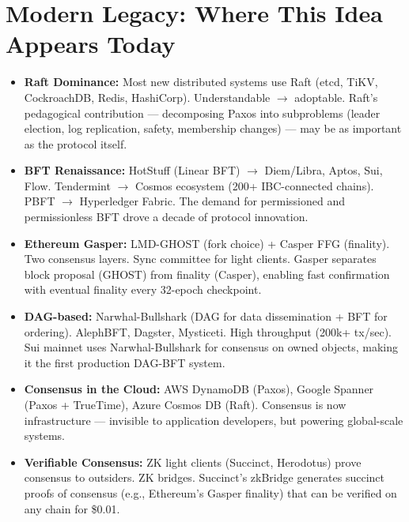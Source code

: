 \section{Modern Legacy: Where This Idea Appears Today}
\label{sec:consensus:legacy}

\begin{itemize}
\item \textbf{Raft Dominance:} Most new distributed systems use Raft (etcd, TiKV, CockroachDB, Redis, HashiCorp). Understandable $\to$ adoptable. Raft's pedagogical contribution — decomposing Paxos into subproblems (leader election, log replication, safety, membership changes) — may be as important as the protocol itself.

\item \textbf{BFT Renaissance:} HotStuff (Linear BFT) $\to$ Diem/Libra, Aptos, Sui, Flow. Tendermint $\to$ Cosmos ecosystem (200+ IBC-connected chains). PBFT $\to$ Hyperledger Fabric. The demand for permissioned and permissionless BFT drove a decade of protocol innovation.

\item \textbf{Ethereum Gasper:} LMD-GHOST (fork choice) + Casper FFG (finality). Two consensus layers. Sync committee for light clients. Gasper separates block proposal (GHOST) from finality (Casper), enabling fast confirmation with eventual finality every 32-epoch checkpoint.

\item \textbf{DAG-based:} Narwhal-Bullshark (DAG for data dissemination + BFT for ordering). AlephBFT, Dagster, Mysticeti. High throughput (200k+ tx/sec). Sui mainnet uses Narwhal-Bullshark for consensus on owned objects, making it the first production DAG-BFT system.

\item \textbf{Consensus in the Cloud:} AWS DynamoDB (Paxos), Google Spanner (Paxos + TrueTime), Azure Cosmos DB (Raft). Consensus is now infrastructure — invisible to application developers, but powering global-scale systems.

\item \textbf{Verifiable Consensus:} ZK light clients (Succinct, Herodotus) prove consensus to outsiders. ZK bridges. Succinct's zkBridge generates succinct proofs of consensus (e.g., Ethereum's Gasper finality) that can be verified on any chain for \$0.01.


\end{itemize}
